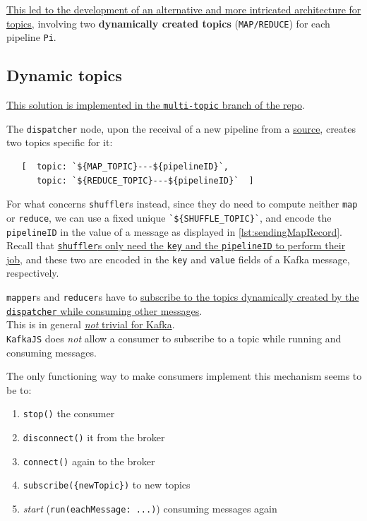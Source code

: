 \ul{This led to the development of an alternative and more intricated architecture for topics}, involving two \textbf{dynamically created topics} (\lstinline|MAP/REDUCE|) for each pipeline \lstinline|Pi|.

\subsection{Dynamic topics}
\ul{This solution is implemented in the \texttt{multi-topic} branch of the repo}.

The \texttt{dispatcher} node, upon the receival of a new pipeline from a \ul{source}, creates two topics specific for it:
\begin{lstlisting}
   [  topic: `${MAP_TOPIC}---${pipelineID}`,
      topic: `${REDUCE_TOPIC}---${pipelineID}`  ]
\end{lstlisting}

For what concerns \texttt{shuffler}s instead, since they do need to compute neither \lstinline|map| or \lstinline|reduce|, we can use a fixed unique \lstinline|`${SHUFFLE_TOPIC}`|, and encode the \lstinline|pipelineID| in the value of a message as displayed in \ref{lst:sendingMapRecord}.\\
Recall that \ul{\texttt{shuffler}s only need the \texttt{key} and the \texttt{pipelineID} to perform their job}, and these two are encoded in the \lstinline|key| and \lstinline|value| fields of a Kafka message, respectively. 

\texttt{mapper}s and \texttt{reducer}s have to \ul{subscribe to the topics dynamically created by the \texttt{dispatcher} while consuming other messages}. \\
This is in general \ul{\textit{not} trivial for Kafka}.\\
\lstinline|KafkaJS| does \textit{not} allow a consumer to subscribe to a topic while running and consuming messages.

{The only functioning way to make consumers implement this mechanism seems to be to:\ns
\begin{enumerate}
   \item \lstinline|stop()| the consumer 
   \item \lstinline|disconnect()| it from the broker
   \item \lstinline|connect()| again to the broker
   \item \lstinline|subscribe({newTopic})| to new topics
   \item \textit{start} (\lstinline|run(eachMessage: ...)|) consuming messages again
\end{enumerate}}

